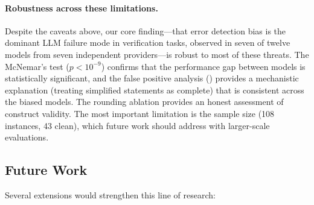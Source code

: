 \documentclass[11pt]{article}
\begin{document}
\paragraph{Robustness across these limitations.}
Despite the caveats above, our core finding---that error detection bias is the dominant LLM failure mode in verification tasks, observed in seven of twelve models from seven independent providers---is robust to most of these threats.
The McNemar's test ($p < 10^{-9}$) confirms that the performance gap between models is statistically significant, and the false positive analysis () provides a mechanistic explanation (treating simplified statements as complete) that is consistent across the biased models.
The rounding ablation provides an honest assessment of construct validity.
The most important limitation is the sample size (108 instances, 43 clean), which future work should address with larger-scale evaluations.

\subsection{Future Work}
\label{sec:future}

Several extensions would strengthen this line of research:
\end{document}
